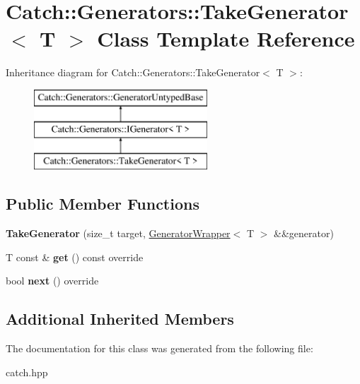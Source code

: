 \hypertarget{classCatch_1_1Generators_1_1TakeGenerator}{}\section{Catch\+::Generators\+::Take\+Generator$<$ T $>$ Class Template Reference}
\label{classCatch_1_1Generators_1_1TakeGenerator}
Inheritance diagram for Catch\+::Generators\+::Take\+Generator$<$ T $>$\+:\begin{figure}[H]
\begin{center}
\leavevmode
\includegraphics[height=3.000000cm]{classCatch_1_1Generators_1_1TakeGenerator}
\end{center}
\end{figure}
\subsection*{Public Member Functions}
\begin{DoxyCompactItemize}
\item 
\mbox{\label{classCatch_1_1Generators_1_1TakeGenerator_aacef789c01a86246249c88a184268c65}} 
{\bfseries Take\+Generator} (size\+\_\+t target, \mbox{\hyperlink{classCatch_1_1Generators_1_1GeneratorWrapper}{Generator\+Wrapper}}$<$ T $>$ \&\&generator)
\item 
\mbox{\label{classCatch_1_1Generators_1_1TakeGenerator_aa4d2560f2066ec2eb4a351d62c107c78}} 
T const  \& {\bfseries get} () const override
\item 
\mbox{\label{classCatch_1_1Generators_1_1TakeGenerator_ae343f3e28fe04e0a20d6fdf69bfb4c78}} 
bool {\bfseries next} () override
\end{DoxyCompactItemize}
\subsection*{Additional Inherited Members}


The documentation for this class was generated from the following file\+:\begin{DoxyCompactItemize}
\item 
catch.\+hpp\end{DoxyCompactItemize}
